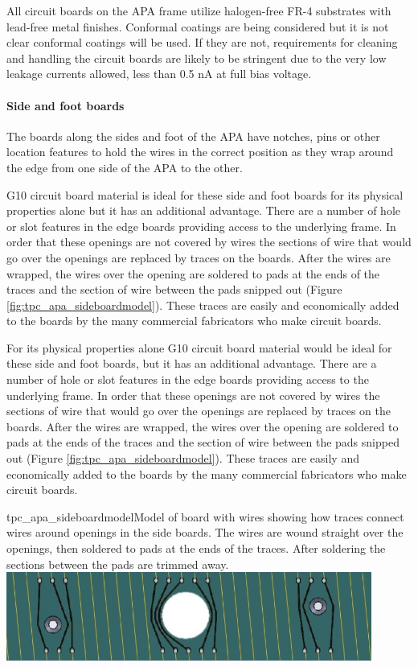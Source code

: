 All circuit boards on the APA frame utilize halogen-free FR-4 substrates with lead-free metal finishes. Conformal coatings are being considered but it is not clear conformal coatings will be used. If they are not, requirements for cleaning and handling the circuit boards are likely to be stringent due to the very low leakage currents allowed, less than 0.5 nA at full bias voltage.

\paragraph{Side and foot boards}

The boards along the sides and foot of the APA have notches, pins or other location features to hold the wires in the correct position as they wrap around the edge from one side of the APA to the other.

G10 circuit board material is ideal for these side and foot boards for its physical properties alone but it has an additional advantage.  There are a number of hole or slot features in the edge boards providing access to the underlying frame.  In order that these openings are not covered by wires the sections of wire that would go over the openings are replaced by traces on the boards.  After the wires are wrapped, the wires over the opening are soldered to pads at the ends of the traces and the section of wire between the pads snipped out (Figure \ref{fig:tpc_apa_sideboardmodel}).  These traces are easily and economically added to the boards by the many commercial fabricators who make circuit boards. 

For its physical properties alone G10 circuit board material would be ideal for these side and foot boards, but it has an additional advantage.  There are a number of hole or slot features in the edge boards providing access to the underlying frame.  In order that these openings are not covered by wires the sections of wire that would go over the openings are replaced by traces on the boards.  After the wires are wrapped, the wires over the opening are soldered to pads at the ends of the traces and the section of wire between the pads snipped out (Figure \ref{fig:tpc_apa_sideboardmodel}).  These traces are easily and economically added to the boards by the many commercial fabricators who make circuit boards.

\begin{cdrfigure}{tpc_apa_sideboardmodel}{Model of board with wires showing how traces connect wires around openings in the side boards.  The wires are wound straight over the openings, then soldered to pads at the ends of the traces.  After soldering the sections between the pads are trimmed away.}
\includegraphics[width=0.9\textwidth]{figures/tpc_apa_sideboardmodel.png} 
\end{cdrfigure}

